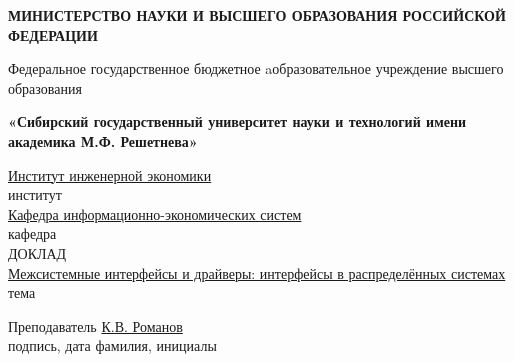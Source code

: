 \documentclass[14pt]{extarticle} %
\begin{document}
\setcounter{page}{1} %

    \begin{center}
        \thispagestyle{empty}         
        \textbf{МИНИСТЕРСТВО НАУКИ И ВЫСШЕГО ОБРАЗОВАНИЯ РОССИЙСКОЙ ФЕДЕРАЦИИ}
       
        Федеральное государственное бюджетное aобразовательное учреждение высшего образования
        
              
        \textbf{«Сибирский государственный университет науки и технологий имени академика М.Ф. Решетнева»}
        
        \uline{Институт инженерной экономики} \\
         {\footnotesize{институт}} \\
        \uline{Кафедра информационно-экономических систем}\\
         {\footnotesize{кафедра}} \\

        {\vspace{4cm}ДОКЛАД}\\               
        \uline{ Межсистемные интерфейсы и драйверы: интерфейсы в распределённых системах}
     \\
        {тема}
        
        \vspace{4.5cm}
        
        \begin{flushleft}
            {Преподаватель} \hspace{6cm} \uline{\hspace{2.9cm}} \uline{\hspace{0.4cm}К.В. Романов\hspace{0.4cm}} \\
            \footnotesize {\hspace{9.9cm} подпись, дата \hspace{0.55cm} фамилия, инициалы}
        \end{flushleft}
        

\end{center}
\end{document}

